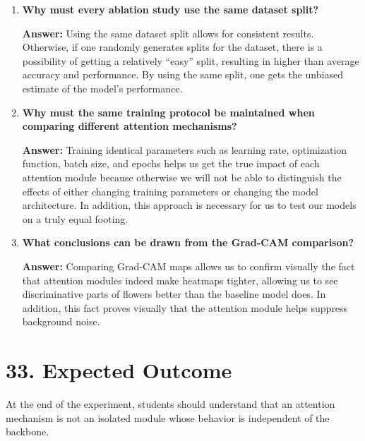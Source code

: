 \documentclass[10pt]{article}
\begin{document}
\begin{enumerate}
\vspace{5mm}

\item \textbf{Why must every ablation study use the same dataset split?}

\textbf{Answer:} Using the same dataset split allows for consistent results. Otherwise, if one randomly generates splits for the dataset, there is a possibility of getting a relatively “easy” split, resulting in higher than average accuracy and performance. By using the same split, one gets the unbiased estimate of the model’s performance.

\vspace{5mm}

\item \textbf{Why must the same training protocol be maintained when comparing
different attention mechanisms?}

\textbf{Answer:} Training identical parameters such as learning rate, optimization function, batch size, and epochs helps us get the true impact of each attention module because otherwise we will not be able to distinguish the effects of either changing training parameters or changing the model architecture. In addition, this approach is necessary for us to test our models on a truly equal footing.

\vspace{5mm}

\item \textbf{What conclusions can be drawn from the Grad-CAM comparison?}

\textbf{Answer:} Comparing Grad-CAM maps allows us to confirm visually the fact that attention modules indeed make heatmaps tighter, allowing us to see discriminative parts of flowers better than the baseline model does. In addition, this fact proves visually that the attention module helps suppress background noise.

\vspace{5mm}

\end{enumerate}


\section*{33. Expected Outcome}

At the end of the experiment, students should understand that an attention
mechanism is not an isolated module whose behavior is independent of the
backbone.
\end{document}
